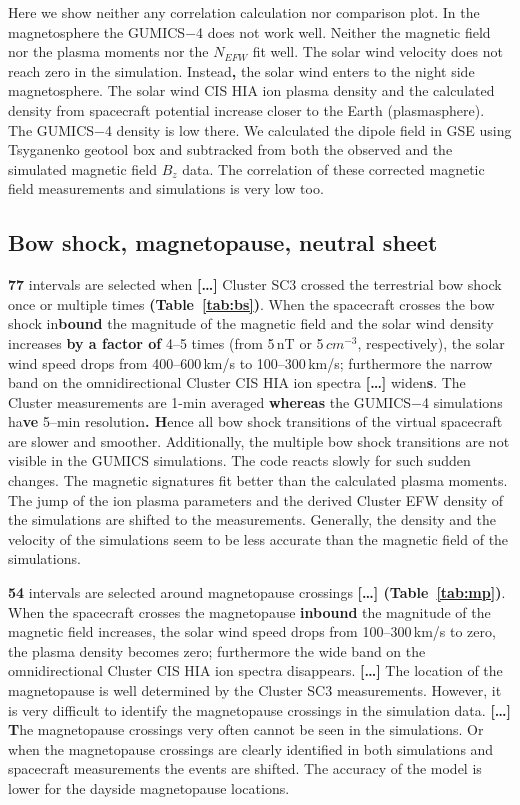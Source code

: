 \documentclass[linenumbers,draft]{agujournal}
\begin{document}
Here we show neither any correlation calculation nor comparison plot. In the magnetosphere the GUMICS$-$4 does not work well. Neither the magnetic field nor the plasma moments nor the $N_{EFW}$ fit well. The solar wind velocity does not reach zero in the simulation. Instead\textbf{,} the solar wind enters to the night side magnetosphere. The solar wind CIS HIA ion plasma density and the calculated density from spacecraft potential increase closer to the Earth (plasmasphere). The GUMICS$-$4 density is low there. We calculated the dipole field in GSE using Tsyganenko geotool box \citep{tsyganenko95:_model_earth} and subtracked from both the observed and the simulated magnetic field $B_z$ data. The correlation of these corrected magnetic field measurements and simulations is very low too. 

\subsection{Bow shock, magnetopause, neutral sheet}
\label{sec:bs}

\textbf{77} intervals are selected when \textbf{[\dots]} Cluster SC3 crossed the terrestrial bow shock once or multiple times \textbf{(Table~\ref{tab:bs})}. When the spacecraft crosses the bow shock in\textbf{bound} the magnitude of the magnetic field and the solar wind density increases \textbf{by a factor of} 4--5 times (from 5\,nT or 5\,$cm^{-3}$, respectively), the solar wind speed drops from 400--600\,km/s to 100--300\,km/s; furthermore the narrow band on the omnidirectional Cluster CIS HIA ion spectra \textbf{[\dots]} widen\textbf{s}. The Cluster measurements are 1-min averaged \textbf{whereas} the GUMICS$-$4 simulations ha\textbf{ve} 5--min resolution\textbf{. H}ence all bow shock transitions of the virtual spacecraft are slower and smoother. Additionally, the multiple bow shock transitions are not visible in the $\mathrm{GUMICS}$ simulations. The code reacts slowly for such sudden changes. The magnetic signatures fit better than the calculated plasma moments. The jump of the ion plasma parameters and the derived Cluster EFW density of the simulations are shifted to the measurements. Generally, the density and the velocity of the simulations seem to be less accurate than the magnetic field of the simulations.

\textbf{54} intervals are selected around magnetopause crossings \textbf{[\dots] (Table~\ref{tab:mp})}. When the spacecraft crosses the magnetopause \textbf{inbound} the magnitude of the magnetic field increases, the solar wind speed drops from 100--300\,km/s to zero, the plasma density becomes zero; furthermore the wide band on the omnidirectional Cluster CIS HIA ion spectra disappears. \textbf{[\dots]} The location of the magnetopause is well determined by the Cluster SC3 measurements. However, it is very difficult to identify the magnetopause crossings in the simulation data. \textbf{[\dots] T}he magnetopause crossings very often cannot be seen in the simulations. Or when the magnetopause crossings are clearly identified in both simulations and spacecraft measurements the events are shifted. The accuracy of the model is lower for the dayside magnetopause locations. 
\end{document}
